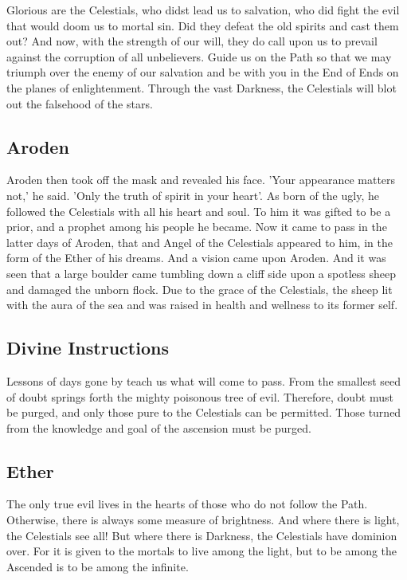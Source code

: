 Glorious are the Celestials, who didst lead us to salvation, who did fight the evil that would doom us to mortal sin. Did they defeat the old spirits and cast them out? And now, with the strength of our will, they do call upon us to prevail against the corruption of all unbelievers. Guide us on the Path so that we may triumph over the enemy of our salvation and be with you in the End of Ends on the planes of enlightenment. Through the vast Darkness, the Celestials will blot out the falsehood of the stars. 

\subsection{Aroden}

Aroden then took off the mask and revealed his face. 'Your appearance matters not,' he said. 'Only the truth of spirit in your heart'. As born of the ugly, he followed the Celestials with all his heart and soul. To him it was gifted to be a prior, and a prophet among his people he became. Now it came to pass in the latter days of Aroden, that and Angel of the Celestials appeared to him, in the form of the Ether of his dreams. And a vision came upon Aroden. And it was seen that a large boulder came tumbling down a cliff side upon a spotless sheep and damaged the unborn flock. Due to the grace of the Celestials, the sheep lit with the aura of the sea and was raised in health and wellness to its former self. 

\subsection{Divine Instructions}

Lessons of days gone by teach us what will come to pass.  From the smallest seed of doubt springs forth the mighty poisonous tree of evil. Therefore, doubt must be purged, and only those pure to the Celestials can be permitted. Those turned from the knowledge and goal of the ascension must be purged.

\subsection{Ether}

The only true evil lives in the hearts of those who do not follow the Path. Otherwise, there is always some measure of brightness. And where there is light, the Celestials see all! But where there is Darkness, the Celestials have dominion over. For it is given to the mortals to live among the light, but to be among the Ascended is to be among the infinite. 

